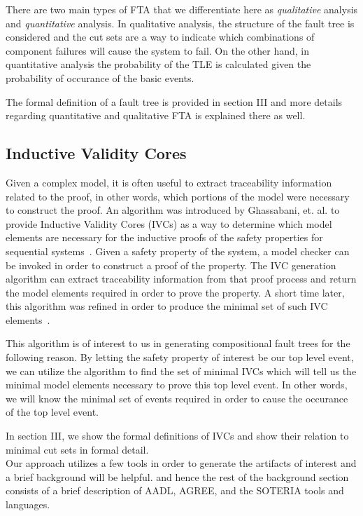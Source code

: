 There are two main types of FTA that we differentiate here as \textit{qualitative} analysis and \textit{quantitative} analysis. In qualitative analysis, the structure of the fault tree is considered and the cut sets are a way to indicate which combinations of component failures will cause the system to fail. On the other hand, in quantitative analysis the probability of the TLE is calculated given the probability of occurance of the basic events. 

The formal definition of a fault tree is provided in section III and more details regarding quantitative and qualitative FTA is explained there as well. 

\subsection{Inductive Validity Cores}

Given a complex model, it is often useful to extract traceability information related to the proof, in other words, which portions of the model were necessary to construct the proof. An algorithm was introduced by Ghassabani, et. al. to provide Inductive Validity Cores (IVCs) as a way to determine which model elements are necessary for the inductive proofs of the safety properties for sequential systems~\cite{GhassabaniGW16}. Given a safety property of the system, a model checker can be invoked in order to construct a proof of the property. The IVC generation algorithm can extract traceability information from that proof process and return the model elements required in order to prove the property. A short time later, this algorithm was refined in order to produce the minimal set of such IVC elements~\cite{Ghassabani2017EfficientGO}. 

This algorithm is of interest to us in generating compositional fault trees for the following reason. By letting the safety property of interest be our top level event, we can utilize the algorithm to find the set of minimal IVCs which will tell us the minimal model elements necessary to prove this top level event. In other words, we will know the minimal set of events required in order to cause the occurance of the top level event. 

In section III, we show the formal definitions of IVCs and show their relation to minimal cut sets in formal detail. \\

Our approach utilizes a few tools in order to generate the artifacts of interest and a brief background will be helpful. and hence the rest of the background section consists of a brief description of AADL, AGREE, and the SOTERIA tools and languages. 


